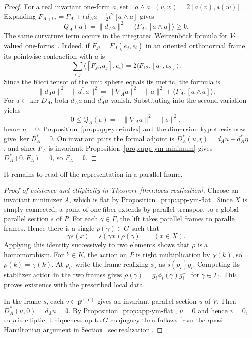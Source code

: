 \documentclass[11pt,a4paper,reqno]{amsart}
\theoremstyle{plain}
\theoremstyle{definition}
\theoremstyle{remark}
\numberwithin{equation}{section}
\newcommand{\fg}{\mathfrak g}
\begin{document}
\begin{proof}
For a real invariant one-form $a$, set $[a\wedge a](v,w)=2[a(v),a(w)]$. Expanding $F_{A+ta}=F_A+t\,d_Aa+\tfrac12t^2[a\wedge a]$ gives
\[
Q_A(a)=\|d_Aa\|^2+\langle F_A,[a\wedge a]\rangle \ge 0.
\]
The same curvature term occurs in the integrated Weitzenb\"ock formula for $V$-valued one-forms~\cite{BourguignonLawson}. Indeed, if $F_{ji}=F_A(e_j,e_i)$ in an oriented orthonormal frame, its pointwise contraction with $a$ is
\[
\sum_{i,j}\langle[F_{ji},a_j],a_i\rangle=2\langle F_{12},[a_1,a_2]\rangle.
\]
Since the Ricci tensor of the unit sphere equals its metric, the formula is
\[
\|d_Aa\|^2+\|d_A^*a\|^2=\|\nabla_Aa\|^2+\|a\|^2+\langle F_A,[a\wedge a]\rangle.
\]
For $a\in\ker D_A$, both $d_Aa$ and $d_A^*a$ vanish. Substituting into the second variation yields
\[
0\le Q_A(a)=-\|\nabla_Aa\|^2-\|a\|^2,
\]
hence $a=0$. Proposition~\ref{prop:app-ym-index} and the dimension hypothesis now give $\ker D_A^*=0$. On invariant pairs the formal adjoint is $D_A^*(u,\eta)=d_Au+d_A^*\eta$, and since $F_A$ is invariant, Proposition~\ref{prop:app-ym-minimum} gives $D_A^*(0,F_A)=0$, so $F_A=0$.
\end{proof}

It remains to read off the representation in a parallel frame.

\begin{proof}[Proof of existence and ellipticity in Theorem~\ref{thm:local-realization}]
Choose an invariant minimizer $A$, which is flat by Proposition~\ref{prop:app-ym-flat}. Since $X$ is simply connected, a point of one fiber extends by parallel transport to a global parallel section $s$ of $P$. For each $\gamma\in\Gamma$, the lift takes parallel frames to parallel frames. Hence there is a single $\rho(\gamma)\in G$ such that
\[
\gamma s(x)=s(\gamma x)\rho(\gamma)\qquad(x\in X).
\]
Applying this identity successively to two elements shows that $\rho$ is a homomorphism. For $k\in K$, the action on $P$ is right multiplication by $\chi(k)$, so $\rho(k)=\chi(k)$. At $p_i$, write the frame realizing $\phi_i$ as $s(p_i)g_i$. Computing its stabilizer action in the two frames gives $\rho(\gamma)=g_i\phi_i(\gamma)g_i^{-1}$ for $\gamma\in\Gamma_i$. This proves existence with the prescribed local data.

In the frame $s$, each $v\in\fg^{\rho(\Gamma)}$ gives an invariant parallel section $u$ of $V$. Then $D_A^*(u,0)=d_Au=0$. By Proposition~\ref{prop:app-ym-flat}, $u=0$ and hence $v=0$, so $\rho$ is elliptic. Uniqueness up to $G$-conjugacy then follows from the quasi-Hamiltonian argument in Section~\ref{sec:realization}.

\end{proof}
\end{document}
